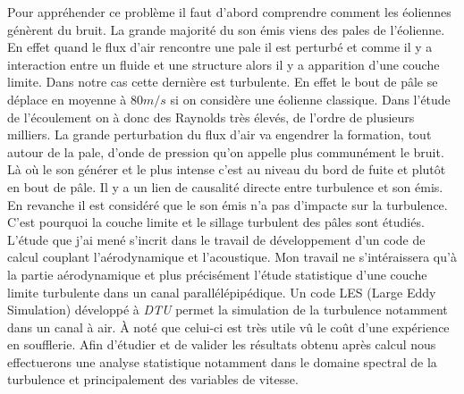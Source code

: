 \documentclass[12pt]{article}
\theoremstyle{plain}
\theoremstyle{remark}
\begin{document}
	Pour appréhender ce problème il faut d'abord comprendre comment les éoliennes génèrent du bruit. La grande majorité du son émis viens des pales de l'éolienne. En effet quand le flux d'air rencontre une pale il est perturbé et comme il y a interaction entre un fluide et une structure alors il y a apparition d'une couche limite. Dans notre cas cette dernière est turbulente. En effet le bout de pâle se déplace en moyenne à $80 m/s$ si on considère une éolienne classique. Dans l'étude de l'écoulement on à donc des Raynolds très élevés, de l'ordre de plusieurs milliers. La grande perturbation du flux d'air va engendrer la formation, tout autour de la pale, d'onde de pression qu'on appelle plus communément le bruit. Là où le son générer et le plus intense c'est au niveau du bord de fuite et plutôt en bout de pâle. Il y a un lien de causalité directe entre turbulence et son émis. En revanche il est considéré que le son émis n'a pas d'impacte sur la turbulence. C'est pourquoi la couche limite et le sillage turbulent des pâles sont étudiés.\\
	
	L'étude que j'ai mené s'incrit dans le travail de développement d'un code de calcul couplant l'aérodynamique et l'acoustique. Mon travail ne s'intéraissera qu'à la partie aérodynamique et plus précisément l'étude statistique d'une couche limite turbulente dans un canal parallélépipédique. Un code LES (Large Eddy Simulation) développé à \textit{DTU} permet la simulation de la turbulence notamment dans un canal à air. À noté que celui-ci est très utile vû le coût d'une expérience en soufflerie. Afin d'étudier et de valider les résultats obtenu après calcul nous effectuerons une analyse statistique notamment dans le domaine spectral de la turbulence et principalement des variables de vitesse. \\
	
\end{document}
